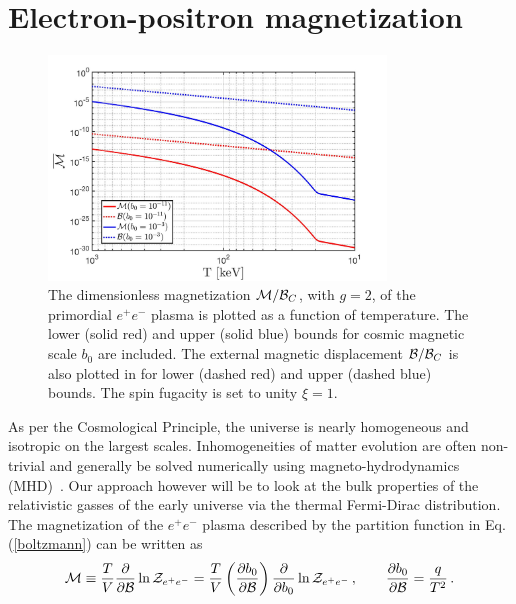 \documentclass[a4paper]{article}
\newcommand{\req}[1]{Eq.\,(\ref{#1})}
\begin{document}
\section{Electron-positron magnetization}
\label{sec:magnetization}
\begin{figure}[ht]
    \centering
    \includegraphics[width=0.8\textwidth]{Magnetization_Hc_new.jpg}
    \caption{The dimensionless magnetization ${\cal M}/{\cal B}_{C}$, with $g=2$, of the primordial $e^{+}e^{-}$ plasma is plotted as a function of temperature. The lower (solid red) and upper (solid blue) bounds for cosmic magnetic scale $b_{0}$ are included. The external magnetic displacement ${\cal B}/{\cal B}_{C}$ is also plotted in for lower (dashed red) and upper (dashed blue) bounds. The spin fugacity is set to unity $\xi=1$.}
    \label{magplot} 
\end{figure}
\noindent As per the Cosmological Principle, the universe is nearly homogeneous and isotropic on the largest scales. Inhomogeneities of matter evolution are often non-trivial and generally be solved numerically using magneto-hydrodynamics (MHD)~\cite{melrose2008quantum,vazza2017simulations}. Our approach however will be to look at the bulk properties of the relativistic gasses of the early universe via the thermal Fermi-Dirac distribution. The magnetization of the $e^{+}e^{-}$ plasma described by the partition function in \req{boltzmann} can be written as
\begin{align}
    \label{defmagetization}
    {\cal M}\equiv\frac{T}{V}\frac{\partial}{\partial{\cal B}}\ln{{\cal Z}_{e^{+}e^{-}}} = \frac{T}{V}\left(\frac{\partial b_{0}}{\partial{\cal B}}\right)\frac{\partial}{\partial b_{0}}\ln{{\cal Z}_{e^{+}e^{-}}}\,,\qquad\frac{\partial b_{0}}{\partial{\cal B}}=\frac{q}{T^{2}}\,.
\end{align}
\end{document}
